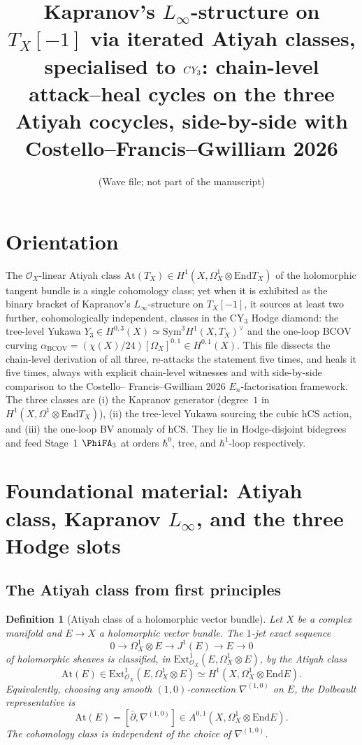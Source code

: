 \documentclass[11pt]{article}
\title{Kapranov's $L_\infty$-structure on $T_X[-1]$ via iterated Atiyah
classes, specialised to $\CY_3$: chain-level attack--heal cycles on the
three Atiyah cocycles, side-by-side with Costello--Francis--Gwilliam
2026}
\author{(Wave file; not part of the manuscript)}
\newtheorem{definition}[theorem]{Definition}
\providecommand{\At}{\mathrm{At}}
\providecommand{\End}{\mathrm{End}}
\providecommand{\CY}{\mathrm{CY}}
\providecommand{\BCOV}{\mathrm{BCOV}}
\providecommand{\hCS}{\mathrm{hCS}}
\providecommand{\Om}{\Omega}
\providecommand{\Sym}{\mathrm{Sym}}
\providecommand{\cO}{\mathcal{O}}
\begin{document}
\maketitle

\section*{Orientation}

The $\cO_X$-linear Atiyah class $\At(T_X) \in H^1(X, \Om^1_X \otimes \End T_X)$
of the holomorphic tangent bundle is a single cohomology class; yet when
it is exhibited as the binary bracket of Kapranov's $L_\infty$-structure on
$T_X[-1]$, it sources at least two further, cohomologically independent,
classes in the $\CY_3$ Hodge diamond: the tree-level Yukawa $Y_3 \in
H^{0,3}(X) \simeq \Sym^3 H^1(X,T_X)^\vee$ and the one-loop BCOV curving
$\alpha_\BCOV = (\chi(X)/24)[\Om_X]^{0,1} \in H^{0,1}(X)$. This file
dissects the chain-level derivation of all three, re-attacks the
statement five times, and heals it five times, always with explicit
chain-level witnesses and with side-by-side comparison to the Costello--
Francis--Gwilliam 2026 $E_n$-factorisation framework. The three classes
are (i) the Kapranov generator (degree~$1$ in $H^1(X,\Om^1 \otimes \End
T_X)$), (ii) the tree-level Yukawa sourcing the cubic $\hCS$ action, and
(iii) the one-loop BV anomaly of $\hCS$. They lie in Hodge-disjoint
bidegrees and feed Stage~1 $\PhiFA_3$ at orders $\hbar^0$, tree, and
$\hbar^1$-loop respectively.

\tableofcontents

\section{Foundational material: Atiyah class, Kapranov $L_\infty$, and
the three Hodge slots}
\label{sec:foundations}

\subsection{The Atiyah class from first principles}
\label{subsec:atiyah-first-principles}

\begin{definition}[Atiyah class of a holomorphic vector bundle]
\label{def:atiyah-class}
Let $X$ be a complex manifold and $E \to X$ a holomorphic vector bundle.
The $1$-jet exact sequence
\[
  0 \longrightarrow \Om^1_X \otimes E \longrightarrow J^1(E)
  \longrightarrow E \longrightarrow 0
\]
of holomorphic sheaves is classified, in $\mathrm{Ext}^1_{\cO_X}(E,
\Om^1_X \otimes E)$, by the Atiyah class
\[
  \At(E) \in \mathrm{Ext}^1_{\cO_X}(E, \Om^1_X \otimes E)
  \simeq H^1(X, \Om^1_X \otimes \End E).
\]
Equivalently, choosing any smooth $(1,0)$-connection $\nabla^{(1,0)}$ on
$E$, the Dolbeault representative is
\begin{equation}
\label{eq:atiyah-dolbeault}
  \At(E) = [\bar\partial, \nabla^{(1,0)}]
  \in A^{0,1}(X, \Om^1_X \otimes \End E).
\end{equation}
The cohomology class is independent of the choice of $\nabla^{(1,0)}$.
\end{definition}
\end{document}
